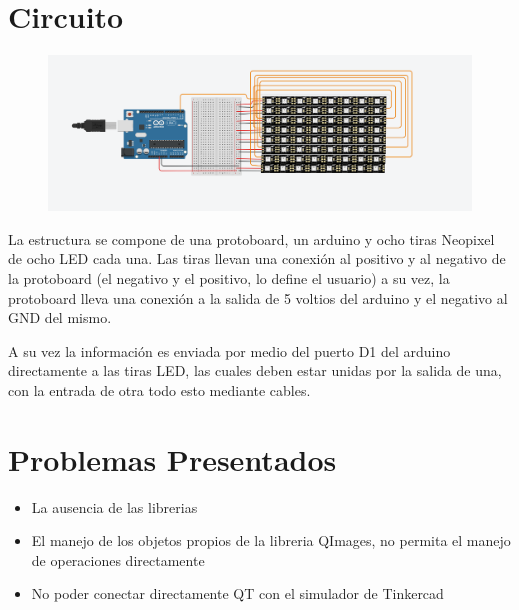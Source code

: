 \documentclass{article}
\begin{document}
\section{Circuito} \label{contenido}
\begin{figure}[h]
\includegraphics[width=15cm]{Circuito.png}
\end{figure}
La estructura se compone de una protoboard, un arduino y ocho tiras Neopixel de ocho LED cada una. Las tiras llevan una conexión al positivo y al negativo de la protoboard (el negativo y el positivo, lo define el usuario) a su vez, la protoboard lleva una conexión a la salida de 5 voltios del arduino y el negativo al GND del mismo.

A su vez la información es enviada por medio del puerto D1 del arduino directamente a las tiras LED, las cuales deben estar unidas por la salida de una, con la entrada de otra todo esto mediante cables.

\section{Problemas Presentados} \label{contenido}
\begin{itemize}
\item La ausencia de las librerias
\item El manejo de los objetos propios de la libreria QImages, no permita el manejo de operaciones directamente
\item No poder conectar directamente QT con el simulador de Tinkercad
\end{itemize}
\end{document}
